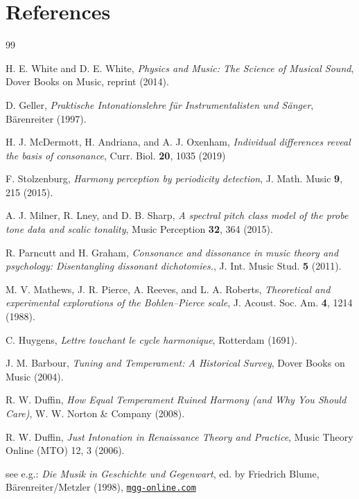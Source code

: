 \documentclass[a4paper,11pt]{iopart}
\begin{document}
\section*{References}
\begin{thebibliography}{99}

H. E. White and D. E. White, \textit{Physics and Music: The Science of Musical Sound}, Dover Books on Music, reprint (2014).

D. Geller, \textit{Praktische Intonationslehre für Instrumentalisten und Sänger}, Bärenreiter (1997).

H. J. McDermott, H. Andriana, and A. J. Oxenham, \textit{Individual differences reveal the basis of consonance}, Curr. Biol. \textbf{20}, 1035 (2019)

F. Stolzenburg, \textit{Harmony perception by periodicity detection}, J. Math. Music \textbf{9}, 215 (2015).

A. J. Milner, R. Lney, and D. B. Sharp, \textit{A spectral pitch class model of the probe tone data and scalic tonality}, Music Perception \textbf{32}, 364 (2015).

R. Parncutt and H. Graham, \textit{Consonance and dissonance in music theory and psychology: Disentangling dissonant dichotomies.}, J. Int. Music Stud. \textbf{5} (2011).

M. V. Mathews, J. R. Pierce, A. Reeves, and L. A. Roberts,
\textit{Theoretical and experimental explorations of the Bohlen--Pierce scale},
J. Acoust. Soc. Am. \textbf{4}, 1214 (1988).

C. Huygens, \textit{Lettre touchant le cycle harmonique}, Rotterdam (1691).

J. M. Barbour, \textit{Tuning and Temperament: A Historical Survey}, Dover Books on Music (2004).

R. W. Duffin, \textit{How Equal Temperament Ruined Harmony (and Why You Should Care)}, W. W. Norton \& Company (2008).

R. W. Duffin, \textit{Just Intonation in Renaissance Theory and Practice}, Music Theory Online (MTO) 12, 3 (2006).

see e.g.: \textit{Die Musik in Geschichte und Gegenwart}, ed. by Friedrich Blume, Bärenreiter/Metzler (1998),  \href{https://mgg-online.com}{\tt mgg-online.com}


\end{thebibliography}
\end{document}
